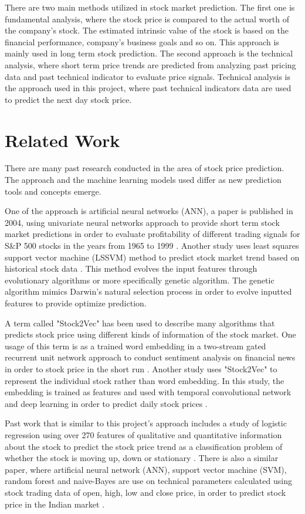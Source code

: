 \documentclass[conference]{IEEEtran}
\begin{document}
There are two main methods utilized in stock market prediction. The first one is fundamental analysis, where the stock price is compared to the actual worth of the company's stock. The estimated intrinsic value of the stock is based on the financial performance, company's business goals and so on. This approach is mainly used in long term stock prediction. The second approach is the technical analysis, where short term price trends are predicted from analyzing past pricing data and past technical indicator to evaluate price signals. Technical analysis is the approach used in this project, where past technical indicators data are used to predict the next day stock price.

\section{Related Work}

There are many past research conducted in the area of stock price prediction. The approach and the machine learning models used differ as new prediction tools and concepts emerge.

One of the approach is artificial neural networks (ANN), a paper is published in 2004, using univariate neural networks approach to provide short term stock market predictions in order to evaluate profitability of different trading signals for S\&P 500 stocks in the years from 1965 to 1999 \cite{b1}. Another study uses least squares support vector machine (LSSVM) method to predict stock market trend based on historical stock data \cite{b2}. This method evolves the input features through evolutionary algorithms or more specifically genetic algorithm. The genetic algorithm mimics Darwin's natural selection process in order to evolve inputted features to provide optimize prediction.

A term called "Stock2Vec" has been used to describe many algorithms that predicts stock price using different kinds of information of the stock market. One usage of this term is as a trained word embedding in a two-stream gated recurrent unit network approach to conduct sentiment analysis on financial news in order to stock price in the short run \cite{b3}. Another study uses "Stock2Vec" to represent the individual stock rather than word embedding. In this study, the embedding is trained as features and used with temporal convolutional network and deep learning in order to predict daily stock prices \cite{b4}.

Past work that is similar to this project's approach includes a study of logistic regression using over 270 features of qualitative and quantitative information about the stock to predict the stock price trend as a classification problem of whether the stock is moving up, down or stationary \cite{b5}. There is also a similar paper, where artificial neural network (ANN), support vector machine (SVM), random forest and naive-Bayes are use on technical parameters calculated using stock trading data of open, high, low and close price, in order to predict stock price in the Indian market \cite{b6}.
\end{document}
